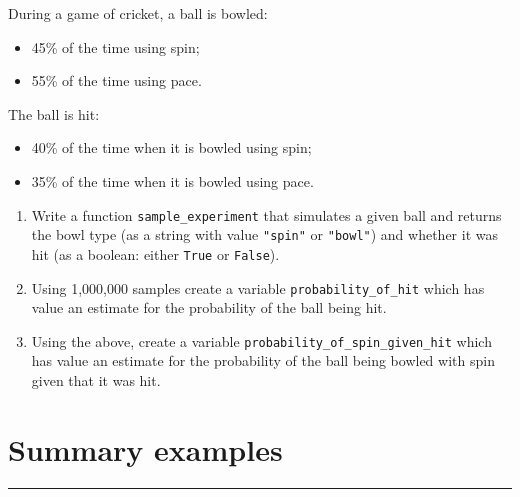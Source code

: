 \documentclass{article}
\begin{document}
During a game of cricket, a ball is bowled:

\begin{itemize}
    \item 45\% of the time using spin;
    \item 55\% of the time using pace.
\end{itemize}

The ball is hit:

\begin{itemize}
    \item 40\% of the time when it is bowled using spin;
    \item 35\% of the time when it is bowled using pace.
\end{itemize}

\begin{enumerate}
    \item Write a function \texttt{sample_experiment} that simulates a given ball
        and returns the bowl type (as a string with value
        \texttt{"spin"} or
        \texttt{"bowl"}) and whether it was hit (as a
        boolean: either \texttt{True} or \texttt{False}).
    \item Using 1,000,000 samples create a variable
        \texttt{probability_of_hit} which
        has value an estimate for the probability of the ball being hit.
    \item Using the above, create a variable
        \texttt{probability_of_spin_given_hit} which has value an estimate for the
        probability of the ball being bowled with spin given that it
        was hit.
\end{enumerate}


\section{Summary examples}
\hrule
\end{document}
